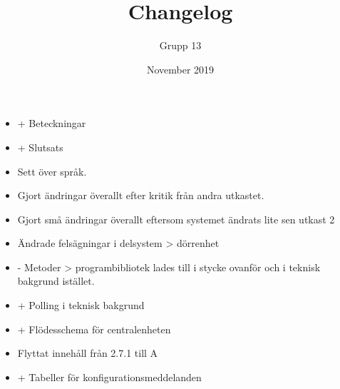 \documentclass{article}
\title{Changelog}
\author{Grupp 13}
\date{November 2019}
\begin{document}
\maketitle
\begin{itemize}
    \item + Beteckningar
    \item + Slutsats
    \item Sett över språk.
    \item Gjort ändringar överallt efter kritik från andra utkastet. 
    \item Gjort små ändringar överallt eftersom systemet ändrats lite sen utkast 2
    \item Ändrade felsägningar i delsystem > dörrenhet
    \item - Metoder > programbibliotek lades till i stycke ovanför och i teknisk bakgrund istället.
    \item + Polling i teknisk bakgrund
    \item + Flödesschema för centralenheten
    \item Flyttat innehåll från 2.7.1 till A
    \item + Tabeller för konfigurationsmeddelanden
\end{itemize}
\end{document}
